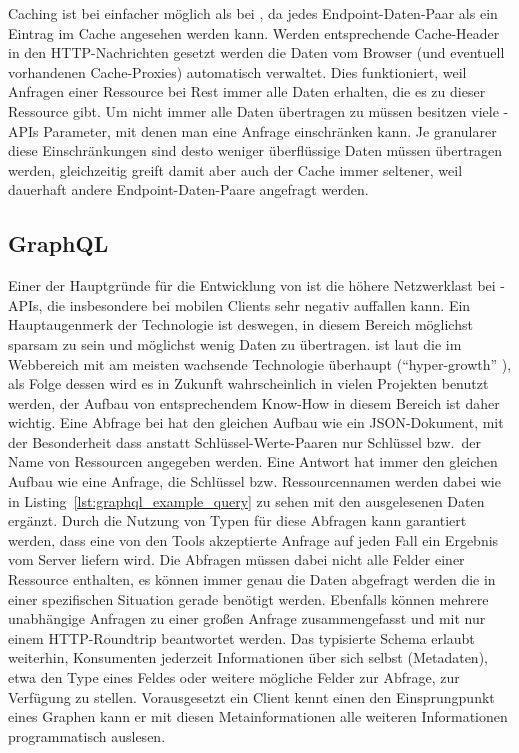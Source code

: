 Caching ist bei  einfacher möglich als bei , da jedes Endpoint-Daten-Paar als ein Eintrag im Cache angesehen werden kann. Werden entsprechende Cache-Header in den HTTP-Nachrichten gesetzt werden die Daten vom Browser (und eventuell vorhandenen Cache-Proxies) automatisch verwaltet. Dies funktioniert, weil Anfragen einer Ressource bei Rest immer alle Daten erhalten, die es zu dieser Ressource gibt. Um nicht immer alle Daten übertragen zu müssen besitzen viele -APIs Parameter, mit denen man eine Anfrage einschränken kann. Je granularer diese Einschränkungen sind desto weniger überflüssige Daten müssen übertragen werden, gleichzeitig greift damit aber auch der Cache immer seltener, weil dauerhaft andere Endpoint-Daten-Paare angefragt werden.

\subsection{GraphQL}\label{subsec:graphql}
Einer der Hauptgründe für die Entwicklung von  ist die höhere Netzwerklast bei -APIs, die insbesondere bei mobilen Clients sehr negativ auffallen kann. Ein Hauptaugenmerk der Technologie ist deswegen, in diesem Bereich möglichst sparsam zu sein und möglichst wenig Daten zu übertragen.
 ist laut  die im Webbereich mit am meisten wachsende Technologie überhaupt (``hyper-growth'' \parencite[unteres Drittel]{npmjs_2018}), als Folge dessen wird es in Zukunft wahrscheinlich in vielen Projekten benutzt werden, der Aufbau von entsprechendem Know-How in diesem Bereich ist daher wichtig.
Eine Abfrage bei  hat den gleichen Aufbau wie ein JSON-Dokument, mit der Besonderheit dass anstatt Schlüssel-Werte-Paaren nur Schlüssel bzw.\ der Name von Ressourcen angegeben werden. Eine Antwort hat immer den gleichen Aufbau wie eine Anfrage, die Schlüssel bzw. Ressourcennamen werden dabei wie in Listing~\ref{lst:graphql_example_query} zu sehen mit den ausgelesenen Daten ergänzt. Durch die Nutzung von Typen für diese Abfragen kann garantiert werden, dass eine von den Tools akzeptierte Anfrage auf jeden Fall ein Ergebnis vom Server liefern wird. Die Abfragen müssen dabei nicht alle Felder einer Ressource enthalten, es können immer genau die Daten abgefragt werden die in einer spezifischen Situation gerade benötigt werden. Ebenfalls können mehrere unabhängige Anfragen zu einer großen Anfrage zusammengefasst und mit nur einem HTTP-Roundtrip beantwortet werden.
Das typisierte Schema erlaubt weiterhin, Konsumenten jederzeit Informationen über sich selbst (Metadaten), etwa den Type eines Feldes oder weitere mögliche Felder zur Abfrage, zur Verfügung zu stellen. Vorausgesetzt ein Client kennt einen den Einsprungpunkt eines Graphen kann er mit diesen Metainformationen alle weiteren Informationen programmatisch auslesen. 

